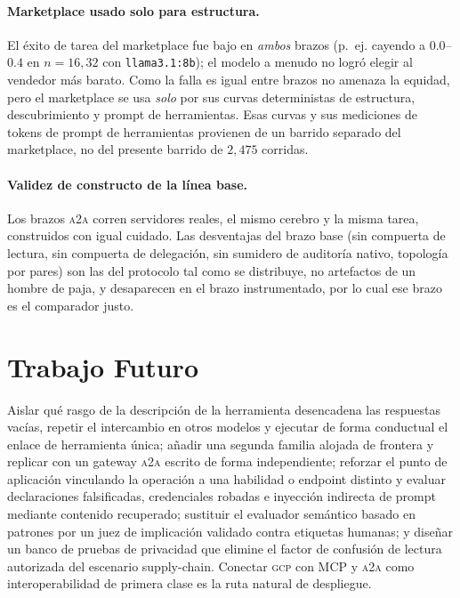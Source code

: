 \documentclass[conference,letterpaper]{IEEEtran}
\newcommand{\gcp}{\textsc{gcp}}
\newcommand{\ata}{\textsc{a2a}}
\begin{document}
\paragraph{Marketplace usado solo para estructura.} El éxito de tarea del marketplace fue bajo en
\emph{ambos} brazos (p.~ej. cayendo a $0.0$--$0.4$ en $n{=}16,32$ con \texttt{llama3.1:8b}); el modelo
a menudo no logró elegir al vendedor más barato. Como la falla es igual entre brazos no amenaza la
equidad, pero el marketplace se usa \emph{solo} por sus curvas deterministas de estructura,
descubrimiento y prompt de herramientas. Esas curvas y sus mediciones de tokens de prompt de
herramientas provienen de un barrido separado del marketplace, no del presente barrido de $2{,}475$
corridas.

\paragraph{Validez de constructo de la línea base.} Los brazos \ata{} corren servidores reales, el mismo
cerebro y la misma tarea, construidos con igual cuidado. Las desventajas del brazo base (sin compuerta
de lectura, sin compuerta de delegación, sin sumidero de auditoría nativo, topología por pares) son las
del protocolo tal como se distribuye, no artefactos de un hombre de paja, y desaparecen en el brazo
instrumentado, por lo cual ese brazo es el comparador justo.

\section{Trabajo Futuro}
Aislar qué rasgo de la descripción de la herramienta desencadena las respuestas vacías, repetir el
intercambio en otros modelos y ejecutar de forma conductual el enlace de herramienta única; añadir una
segunda familia alojada de frontera y replicar con un gateway \ata{} escrito de forma independiente;
reforzar el punto de aplicación vinculando la operación a una habilidad o endpoint distinto y evaluar
declaraciones falsificadas, credenciales robadas e
inyección indirecta de prompt mediante contenido recuperado; sustituir el evaluador semántico basado en
patrones por un juez de implicación validado contra etiquetas humanas; y diseñar un banco de pruebas de
privacidad que elimine el factor de confusión de lectura autorizada del escenario supply-chain. Conectar
\gcp{} con MCP y \ata{} como interoperabilidad de primera clase es la ruta natural de despliegue.
\end{document}
